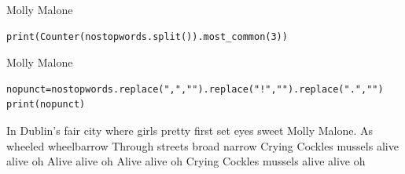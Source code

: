 \documentclass[handout]{beamer}
\begin{document}
\begin{frame}[fragile]{Molly Malone}
	
\begin{lstlisting}
print(Counter(nostopwords.split()).most_common(3))
	\end{lstlisting}
	
\begin{lstlistingoutput}
\end{lstlistingoutput}
	
	
	
	
\end{frame}


\begin{frame}[fragile]{Molly Malone}
	
\begin{lstlisting}
nopunct=nostopwords.replace(",","").replace("!","").replace(".","")
print(nopunct)
\end{lstlisting}
	
\begin{lstlistingoutput}
In Dublin's fair city where girls pretty first set eyes sweet Molly Malone. As wheeled wheelbarrow Through streets broad narrow Crying Cockles mussels alive alive oh Alive alive oh Alive alive oh Crying Cockles mussels alive alive oh
\end{lstlistingoutput}
	
	
\end{frame}
\end{document}
